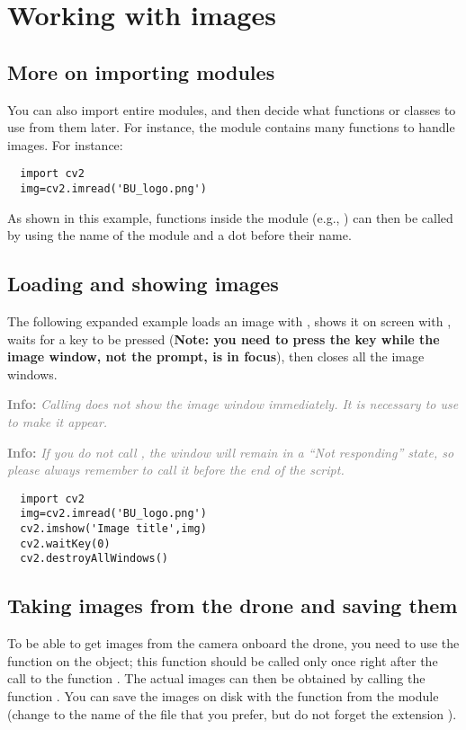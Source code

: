 \documentclass[12pt]{article}
\newcommand{\textsfbf}[1]{\textsf{\textbf{#1}}}
\newcommand{\info}[1]{\par\textcolor{gray}{\textsfbf{Info:} \emph{#1}}}
\begin{document}
\section{Working with images}

\subsection{More on importing modules}
You can also import entire modules, and then decide what functions or classes to use from them later. For instance, the module  contains many functions to handle images. 
For instance:
\begin{lstlisting}
  import cv2
  img=cv2.imread('BU_logo.png')
\end{lstlisting}
As shown in this example, functions inside the module (e.g., ) can then be called by using the name of the module  and a dot  before their name. 

\subsection{Loading and showing images}
The following expanded example loads an image with , shows it on screen with , waits for a key to be pressed (\textbf{Note: you need to press the key while the image window, not the prompt, is in focus}), then closes all the image windows.
\info{Calling  does not show the image window immediately. It is necessary to use \var{waitKey} to make it appear.}
\info{If you do not call , the window will remain in a ``Not responding'' state, so please always remember to call it before the end of the script.}
\begin{lstlisting}
  import cv2
  img=cv2.imread('BU_logo.png')
  cv2.imshow('Image title',img)
  cv2.waitKey(0)
  cv2.destroyAllWindows()
\end{lstlisting}

\subsection{Taking images from the drone and saving them}
To be able to get images from the camera onboard the drone, you need to use the function  on the  object; this function should be called only once right after the call to the function .
The actual images can then be obtained by calling the function .
You can save the images on disk with the function  from the  module (change  to the name of the file that you prefer, but do not forget the extension ).
\end{document}

